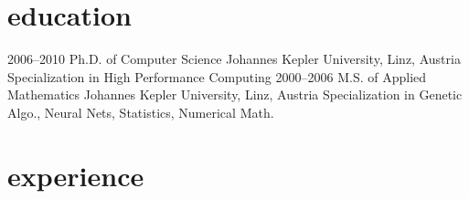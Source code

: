 \documentclass[]{friggeri-cv} %
\begin{document}

\section{education}

\begin{entrylist}
\entry
{2006--2010}
{Ph.D. {\normalfont of Computer Science}}
{Johannes Kepler University, Linz, Austria}
{Specialization in High Performance Computing}
\entry
{2000--2006}
{M.S. {\normalfont of Applied Mathematics}}
{Johannes Kepler University, Linz, Austria}
{Specialization in Genetic Algo., Neural Nets, Statistics, Numerical Math.}
\end{entrylist}


\section{experience}
\end{document}
